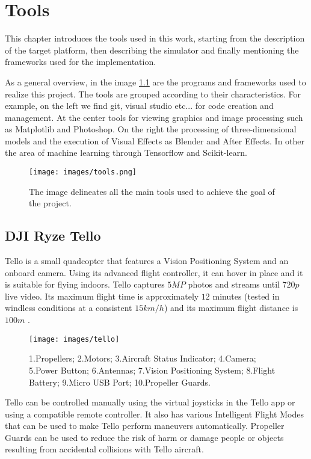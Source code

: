 \chapter{Tools}
\label{chap:impl}
This chapter introduces the tools used in this work, starting from the description of the target platform, then describing the simulator and finally mentioning the frameworks used for the implementation.

\noindent As a general overview, in the image \ref{fig:toolsused} are the programs and frameworks used to realize this project. The tools are grouped according to their characteristics. For example, on the left we find git, visual studio etc... for code creation and management. At the center tools for viewing graphics and image processing such as Matplotlib and Photoshop. On the right the processing of three-dimensional models and the execution of Visual Effects as Blender and After Effects. In other the area of machine learning through Tensorflow and Scikit-learn.

\begin{figure}[H]
	\centering
	\texttt{[image: images/tools.png]}
	\caption[All tools used.]{The image delineates all the main tools used to achieve the goal of the project.}
	\label{fig:toolsused}
\end{figure}

\section{DJI Ryze Tello}
\label{subsec:tello}
Tello is a small quadcopter that features a Vision Positioning System and an onboard camera. Using its advanced flight controller, it can hover in place and it is suitable for flying indoors. Tello captures $5MP$ photos and streams until $720p$ live video. Its maximum flight time is approximately $12$ minutes (tested in windless conditions at a consistent $15km/h$) and its maximum flight distance is $100m$ \cite[]{djitelloguide}.

\begin{figure}[H]
	\centering
	\texttt{[image: images/tello]}
	\caption[Tello - Aircraft diagram.]{1.Propellers; 2.Motors; 3.Aircraft Status Indicator; 4.Camera; 5.Power Button; 6.Antennas; 7.Vision Positioning System; 8.Flight Battery; 9.Micro USB Port; 10.Propeller Guards.}
	\label{fig:telloairdiagr}
\end{figure}

\noindent Tello can be controlled manually using the virtual joysticks in the Tello app or using a compatible remote controller. It also has various Intelligent Flight Modes that can be used to make Tello perform maneuvers automatically. Propeller Guards can be used to reduce the risk of harm or damage people or objects resulting from accidental collisions with Tello aircraft.

